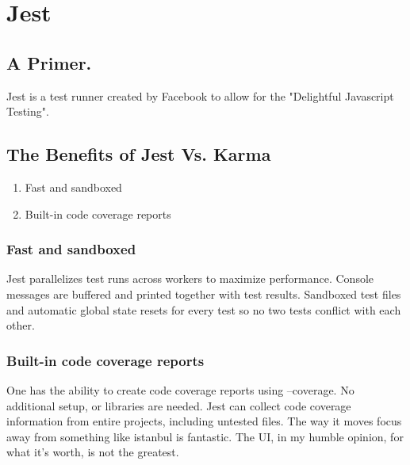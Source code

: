 \maketitle{}
\section{ Jest }

\subsection{ A Primer. }
Jest is a test runner created by Facebook to allow for the "Delightful
Javascript Testing".

\subsection{ The Benefits of Jest Vs. Karma }
\begin{enumerate}
  \item Fast and sandboxed
  \item Built-in code coverage reports
\end{enumerate}

\subsubsection{ Fast and sandboxed }
Jest parallelizes test runs across workers to maximize performance.
Console messages are buffered and printed together with test results. Sandboxed
test files and automatic global state resets for every test so no two tests
conflict with each other.

\subsubsection{ Built-in code coverage reports }
One has the ability to create code coverage reports using --coverage.  No
additional setup, or libraries are needed. Jest can collect code coverage
information from entire projects, including untested files. The way it moves
focus away from something like istanbul is fantastic. The UI, in my humble
opinion, for what it's worth, is not the greatest.
